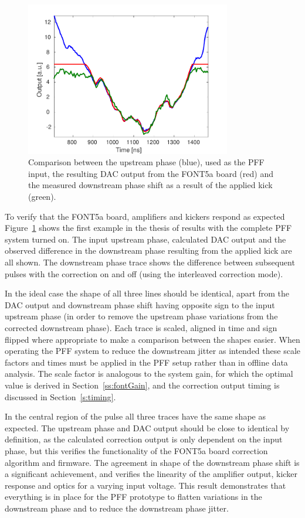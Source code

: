 \begin{figure}
  \centering
  \includegraphics[width=0.8\textwidth]{Figures/commissioning/pffKickShape}
  \caption{Comparison between the upstream phase (blue), used as the PFF input, the resulting DAC output from the FONT5a board (red) and the measured downstream phase shift as a result of the applied kick (green).}
  \label{f:pffKickShape}
\end{figure}

To verify that the FONT5a board, amplifiers and kickers respond as expected Figure~\ref{f:pffKickShape} shows the first example in the thesis of results with the complete PFF system turned on. 
The input upstream phase, calculated DAC output and the observed difference in the downstream phase resulting from the applied kick are all shown. The downstream phase trace shows the difference between subsequent pulses with the correction on and off (using the interleaved correction mode). 

In the ideal case the shape of all three lines should be identical, apart from the DAC output and downstream phase shift having opposite sign to the input upstream phase (in order to remove the upstream phase variations from the corrected downstream phase).
Each trace is scaled, aligned in time and sign flipped where appropriate to make a comparison between the shapes easier.
When operating the PFF system to reduce the downstream jitter as intended these scale factors and times must be applied in the PFF
setup rather than in offline data analysis. The scale factor is analogous to the system gain, for which the optimal value is derived
in Section~\ref{ss:fontGain}, and the correction output timing is
discussed in Section~\ref{s:timing}.

In the central region of the pulse all three traces have the same shape as expected. The upstream phase and DAC output should be close to identical by definition, as the calculated correction output is only dependent on the input phase, but this verifies the functionality of the FONT5a board correction algorithm and firmware. The agreement in shape of the downstream phase shift is a significant achievement, and verifies the linearity of the amplifier output, kicker response and optics for a varying input voltage. This result demonstrates that everything is in place for the PFF prototype to flatten variations in the downstream phase and to reduce the downstream phase jitter.

